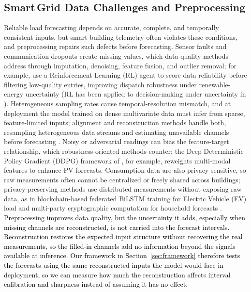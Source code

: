 \documentclass[final,10pt,1p,authoryear]{elsarticle}
\theoremstyle{definition}
\begin{document}
\subsection{Smart\,Grid Data Challenges and Preprocessing}
Reliable load forecasting depends on accurate, complete, and temporally consistent inputs, but smart-building telemetry often violates these conditions, and preprocessing repairs such defects before forecasting. Sensor faults and communication dropouts create missing values, which data-quality methods address through imputation, denoising, feature fusion, and outlier removal; for example, \citet{Data_Purification} use a Reinforcement Learning (RL) agent to score data reliability before filtering low-quality entries, improving dispatch robustness under renewable-energy uncertainty (RL has been applied to decision-making under uncertainty in \citet{11106806,11054162,10978324}). Heterogeneous sampling rates cause temporal-resolution mismatch, and at deployment the model trained on dense multivariate data must infer from sparse, feature-limited inputs; alignment and reconstruction methods handle both, resampling heterogeneous data streams and estimating unavailable channels before forecasting \citet{sundararajan2022data,Multioutput}. Noisy or adversarial readings can bias the feature-target relationship, which robustness-oriented methods counter; the Deep Deterministic Policy Gradient (DDPG) framework of \citet{Robust_PV1}, for example, reweights multi-modal features to enhance PV forecasts. Consumption data are also privacy-sensitive, so raw measurements often cannot be centralized or freely shared across buildings; privacy-preserving methods use distributed measurements without exposing raw data, as in blockchain-based federated BiLSTM training for Electric Vehicle (EV) load \citet{Block_FeDL} and multi-party cryptographic computation for household forecasts \citet{PrivGrid}. \textcolor{black}{Preprocessing improves data quality, but the uncertainty it adds, especially when missing channels are reconstructed, is not carried into the forecast intervals. Reconstruction restores the expected input structure without recovering the real measurements, so the filled-in channels add no information beyond the signals available at inference. Our framework in Section~\ref{sec:framework} therefore tests the forecasts using the same reconstructed inputs the model would face in deployment, so we can measure how much the reconstruction affects interval calibration and sharpness instead of assuming it has no effect.}
\end{document}
